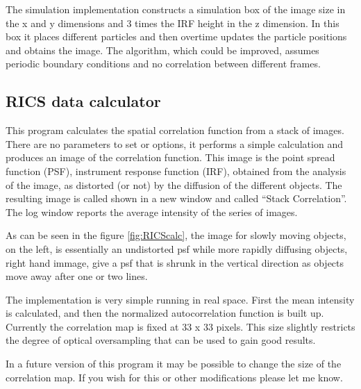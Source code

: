 \documentclass[10pt]{article}
\begin{document}
The simulation implementation constructs a simulation box of the image size in 
the x and y dimensions and 3 times the IRF height in the z dimension. In this 
box it places different particles and then overtime updates the particle 
positions and obtains the image. The algorithm, which could be improved, assumes 
periodic boundary conditions and no correlation between different frames.

\subsection{RICS data calculator}

This program calculates the spatial correlation function from a stack of images. 
There are no parameters to set or options, it performs a simple calculation and 
produces an image of the correlation function. This image is the point spread 
function (PSF), instrument response function (IRF), obtained from the analysis of 
the image, as distorted (or not) by the diffusion of the different objects. The 
resulting image is called shown in a new window and called ``Stack Correlation''.
The log window reports the average intensity of the series of images.

As can be seen in the figure \ref{fig:RICScalc}, the image for slowly moving objects, 
on the left, is essentially an undistorted psf while more rapidly diffusing objects,
right hand immage, give a psf that is shrunk in the vertical direction as objects 
move away after one or two lines.

The implementation is very simple running in real space. 
First the mean intensity is calculated, and then the normalized autocorrelation 
function is built up. Currently the correlation map is fixed at 33 x 33 pixels.
This size slightly restricts the degree of optical oversampling that can be used
to gain good results.

In a future version of this program it may be possible to change the size of the
correlation map. If you wish for this or other modifications please let me know.
\end{document}
